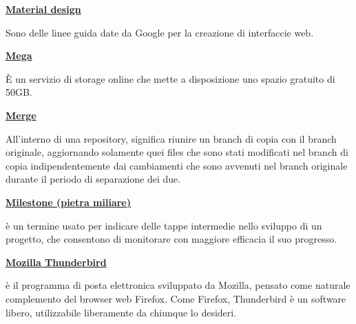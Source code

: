 \bigskip
\begin{addmargin}[0em]{0em}	
	\textbf{\underline{Material design}}
\end{addmargin}
	
\medskip
\begin{addmargin}[5em]{1em}
Sono delle linee guida date da Google per la creazione di interfaccie web.	
\end{addmargin}	

\bigskip
\begin{addmargin}[0em]{0em}	
	\textbf{\underline{Mega}} 
\end{addmargin}
	
\medskip
\begin{addmargin}[5em]{1em}
È un servizio di storage online che mette a disposizione uno spazio gratuito di 50GB. 
\end{addmargin}	

\bigskip
\begin{addmargin}[0em]{0em}	
	\textbf{\underline{Merge}} 
\end{addmargin}

\medskip
\begin{addmargin}[5em]{1em}	
All'interno di una repository, significa riunire un branch di copia con il branch originale, aggiornando solamente quei files che sono stati modificati nel branch di copia indipendentemente
dai cambiamenti che sono avvenuti nel branch originale durante il periodo di separazione dei due.
\end{addmargin}

\newpage
\begin{addmargin}[0em]{0em}	
	\textbf{\underline{Milestone (pietra miliare)}} 
\end{addmargin}
	
\medskip
\begin{addmargin}[5em]{1em}	
è un termine usato per indicare delle tappe intermedie nello sviluppo di un progetto, che consentono di monitorare con maggiore efficacia il suo progresso.
\end{addmargin}	

\bigskip
\begin{addmargin}[0em]{0em}	
	\textbf{\underline{Mozilla Thunderbird}} 
\end{addmargin}

\medskip
\begin{addmargin}[5em]{1em}	
è il programma di posta elettronica sviluppato da Mozilla, pensato come naturale complemento del browser web Firefox. 
Come Firefox, Thunderbird è un software libero, utilizzabile liberamente da chiunque lo desideri.
\end{addmargin}	


